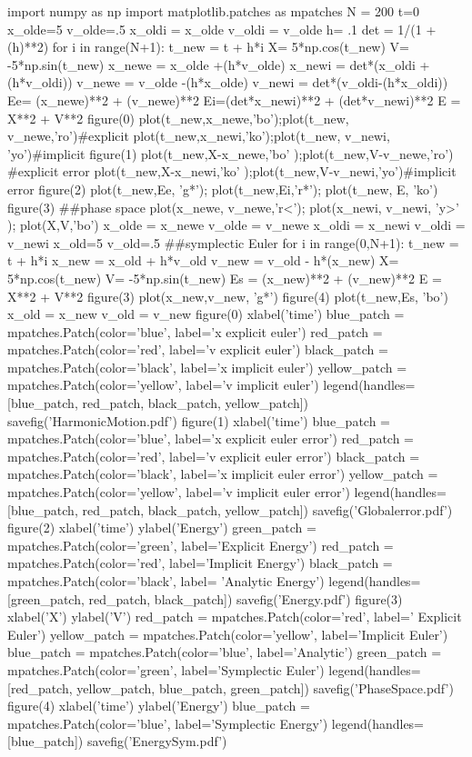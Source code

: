 \documentclass{article}
\begin{document}
\begin{pylabcode}[firstsession]
import numpy as np
import matplotlib.patches as mpatches
N = 200
t=0
x_olde=5
v_olde=.5
x_oldi = x_olde
v_oldi = v_olde
h= .1
det = 1/(1 + (h)**2)
for i in range(N+1): 
    t_new = t + h*i
    X= 5*np.cos(t_new)
    V= -5*np.sin(t_new)
    x_newe = x_olde +(h*v_olde)
    x_newi = det*(x_oldi +(h*v_oldi))
    v_newe = v_olde -(h*x_olde)
    v_newi = det*(v_oldi-(h*x_oldi))
    Ee= (x_newe)**2 + (v_newe)**2
    Ei=(det*x_newi)**2 + (det*v_newi)**2
    E = X**2 + V**2
    figure(0)
    plot(t_new,x_newe,'bo');plot(t_new, v_newe,'ro')#explicit
    plot(t_new,x_newi,'ko');plot(t_new, v_newi, 'yo')#implicit
    figure(1)
    plot(t_new,X-x_newe,'bo' );plot(t_new,V-v_newe,'ro') #explicit error
    plot(t_new,X-x_newi,'ko' );plot(t_new,V-v_newi,'yo')#implicit error
    figure(2)
    plot(t_new,Ee, 'g*'); plot(t_new,Ei,'r*'); plot(t_new, E, 'ko')
    figure(3)
    ##phase space
    plot(x_newe, v_newe,'r<'); plot(x_newi, v_newi, 'y>' ); plot(X,V,'bo')
    x_olde = x_newe
    v_olde = v_newe
    x_oldi = x_newi
    v_oldi = v_newi
x_old=5
v_old=.5  
##symplectic Euler
for i in range(0,N+1):
    t_new = t + h*i
    x_new = x_old + h*v_old
    v_new = v_old - h*(x_new)
    X= 5*np.cos(t_new)
    V= -5*np.sin(t_new)
    Es = (x_new)**2 + (v_new)**2
    E = X**2 + V**2
    figure(3)
    plot(x_new,v_new, 'g*')
    figure(4)
    plot(t_new,Es, 'bo')
    x_old = x_new
    v_old = v_new
figure(0)
xlabel('time')
blue_patch = mpatches.Patch(color='blue', label='x explicit euler')
red_patch = mpatches.Patch(color='red', label='v explicit euler')
black_patch = mpatches.Patch(color='black', label='x implicit euler')
yellow_patch = mpatches.Patch(color='yellow', label='v implicit euler')
legend(handles=[blue_patch, red_patch, black_patch, yellow_patch])
savefig('HarmonicMotion.pdf')
figure(1)
xlabel('time')
blue_patch = mpatches.Patch(color='blue', label='x explicit euler error')
red_patch = mpatches.Patch(color='red', label='v explicit euler error')
black_patch = mpatches.Patch(color='black', label='x implicit euler error')
yellow_patch = mpatches.Patch(color='yellow', label='v implicit euler error')
legend(handles=[blue_patch, red_patch, black_patch, yellow_patch])
savefig('Globalerror.pdf')
figure(2)
xlabel('time')
ylabel('Energy')
green_patch = mpatches.Patch(color='green', label='Explicit Energy')
red_patch = mpatches.Patch(color='red', label='Implicit Energy')
black_patch = mpatches.Patch(color='black', label= 'Analytic Energy')
legend(handles= [green_patch, red_patch, black_patch])
savefig('Energy.pdf')
figure(3)
xlabel('X')
ylabel('V')
red_patch = mpatches.Patch(color='red', label=' Explicit Euler')
yellow_patch = mpatches.Patch(color='yellow', label='Implicit Euler')
blue_patch = mpatches.Patch(color='blue', label='Analytic')
green_patch = mpatches.Patch(color='green', label='Symplectic Euler')
legend(handles=[red_patch, yellow_patch, blue_patch, green_patch])
savefig('PhaseSpace.pdf')
figure(4)
xlabel('time')
ylabel('Energy')
blue_patch = mpatches.Patch(color='blue', label='Symplectic Energy')
legend(handles= [blue_patch])
savefig('EnergySym.pdf')

\end{pylabcode}
\end{document}
